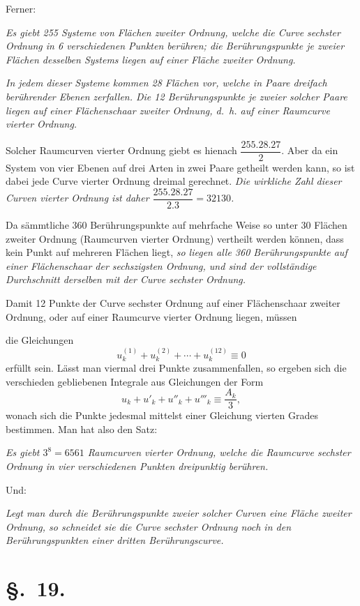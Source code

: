 \documentclass{article}
\begin{document}
Ferner:

\emph{Es giebt 255 Systeme von Flächen zweiter Ordnung, welche die Curve sechster Ordnung in 6 verschiedenen Punkten berühren; die Berührungspunkte je zweier Flächen desselben Systems liegen auf einer Fläche zweiter Ordnung.}

\emph{In jedem dieser Systeme kommen 28 Flächen vor, welche in Paare dreifach berührender Ebenen zerfallen. Die 12 Berührungspunkte je zweier solcher Paare liegen auf einer Flächenschaar zweiter Ordnung, d.\ h. auf einer Raumcurve vierter Ordnung.}

Solcher Raumcurven vierter Ordnung giebt es hienach $\dfrac{255.28.27}{2}$. Aber da ein System von vier Ebenen auf drei Arten in zwei Paare getheilt werden kann, so ist dabei jede Curve vierter Ordnung dreimal gerechnet. \emph{Die wirkliche Zahl dieser Curven vierter Ordnung ist daher $\dfrac{255.28.27}{2.3}=32130$.}

Da sämmtliche 360 Berührungspunkte auf mehrfache Weise so unter 30 Flächen zweiter Ordnung (Raumcurven vierter Ordnung) vertheilt werden können, dass kein Punkt auf mehreren Flächen liegt, \emph{so liegen alle 360 Berührungspunkte auf einer Flächenschaar der sechszigsten Ordnung, und sind der vollständige Durchschnitt derselben mit der Curve sechster Ordnung.}

Damit 12 Punkte der Curve sechster Ordnung auf einer Flächenschaar zweiter Ordnung, oder auf einer Raumcurve vierter Ordnung liegen, müssen

die Gleichungen
\[ u_{k}^{(1)}+u_{k}^{(2)}+\cdots+u_{k}^{(12)} \equiv 0 \]
erfüllt sein. Lässt man viermal drei Punkte zusammenfallen, so ergeben sich die verschieden gebliebenen Integrale aus Gleichungen der Form
\[ u_{k}+u'_{k}+u''_{k}+u'''_{k} \equiv \frac{A_{k}}{3}, \]
wonach sich die Punkte jedesmal mittelst einer Gleichung vierten Grades bestimmen. Man hat also den Satz:

\emph{Es giebt $3^{8} = 6561$ Raumcurven vierter Ordnung, welche die Raumcurve sechster Ordnung in vier verschiedenen Punkten dreipunktig berühren.}

Und:

\emph{Legt man durch die Berührungspunkte zweier solcher Curven eine Fläche zweiter Ordnung, so schneidet sie die Curve sechster Ordnung noch in den Berührungspunkten einer dritten Berührungscurve.}

\section*{§.~19.}
\end{document}
